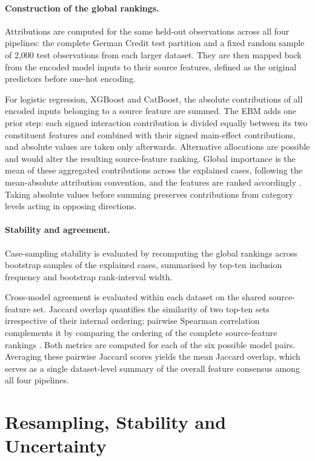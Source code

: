 \paragraph{Construction of the global rankings.}
Attributions are computed for the same held-out observations across all four
pipelines: the complete German Credit test partition and a fixed random sample
of 2{,}000 test observations from each larger dataset. They are then mapped back
from the encoded model inputs to their source features, defined as the original
predictors before one-hot encoding.

For logistic regression, XGBoost and CatBoost, the absolute contributions of all
encoded inputs belonging to a source feature are summed. The EBM adds one prior
step: each signed interaction contribution is divided equally between its two
constituent features and combined with their signed main-effect contributions,
and absolute values are taken only afterwards. Alternative allocations are possible and would alter the resulting source-feature ranking. Global importance is the mean of
these aggregated contributions across the explained cases, following the
mean-absolute attribution convention, and the features are ranked accordingly
\citep{lundbergLocalExplanationsGlobal2020}. Taking absolute values before
summing preserves contributions from category levels acting in opposing
directions.

\paragraph{Stability and agreement.}
Case-sampling stability is evaluated by recomputing the global rankings across
bootstrap samples of the explained cases, summarised by top-ten inclusion
frequency and bootstrap rank-interval width.

Cross-model agreement is evaluated within each dataset on the shared
source-feature set. Jaccard overlap quantifies the similarity of two top-ten sets
irrespective of their internal ordering; pairwise Spearman correlation
complements it by comparing the ordering of the complete source-feature
rankings \citep{nautaAnecdotalEvidenceQuantitative2023}. Both metrics are computed for
each of the six possible model pairs. Averaging these pairwise Jaccard scores
yields the mean Jaccard overlap, which serves as a single dataset-level summary
of the overall feature consensus among all four pipelines.


\section{Resampling, Stability and Uncertainty}\label{sec:comparison}

